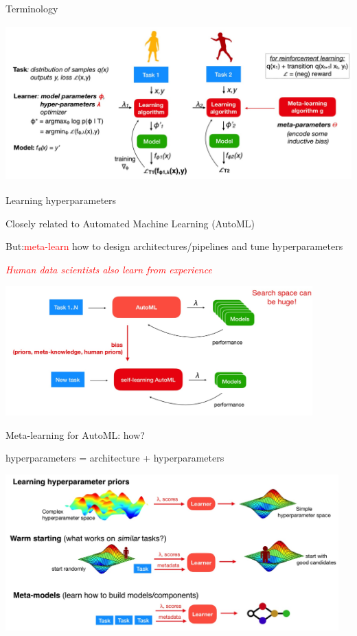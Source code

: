 \documentclass[aspectratio=169,t,handout,xcolor={usenames,dvipsnames}]{beamer}
\begin{document}
\begin{frame}{Terminology}

\centering\includegraphics[height=6cm]{image/Jietu20220328-194806.jpg}

\end{frame}

\begin{frame}{Learning hyperparameters}
\centerline{Closely related to Automated Machine Learning (AutoML)}
\centerline{But:\textcolor{red}{meta-learn }how to design architectures/pipelines and tune hyperparameters}
\centerline{\textit{\textcolor{red}{Human data scientists also learn from experience}}}
\centering\includegraphics[height=5cm]{image/Jietu20220328-195244.jpg}
\end{frame}


\begin{frame}{Meta-learning for AutoML: how?}
\small\centerline{hyperparameters = architecture + hyperparameters}


\centering\includegraphics[height=6cm]{image/Jietu20220328-195525.jpg}

\end{frame}
\end{document}
